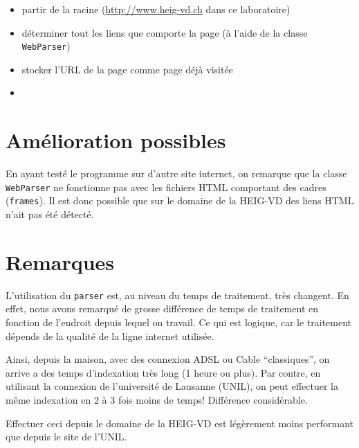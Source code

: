 \documentclass[a4paper, 11pt]{article}
\begin{document}
{\begin{itemize}
	\item partir de la racine (\url{http://www.heig-vd.ch} dans ce laboratoire)
	\item déterminer tout les liens que comporte la page (à l'aide de la classe \texttt{WebParser})
	\item stocker l'URL de la page comme page déjà visitée
	\item 
\end{itemize}

\section{Amélioration possibles} 

En ayant testé le programme sur d'autre site internet, on remarque que la classe \texttt{WebParser} ne fonctionne pas avec les fichiers HTML comportant des cadres (\texttt{frames}). Il est donc possible que sur le domaine de la HEIG-VD des liens HTML n'ait pas été détecté.



\section{Remarques} 

L'utilisation du \texttt{parser} est, au niveau du temps de traitement, très changent. En effet, nous avons remarqué de grosse différence de temps de traitement en fonction de l'endroit depuis lequel on travail. Ce qui est logique, car le traitement dépends de la qualité de la ligne internet utilisée.

Ainsi, depuis la maison, avec des connexion ADSL ou Cable “classiques”, on arrive a des temps d'indexation très long (1 heure ou plus). Par contre, en utilisant la connexion de l'université de Lausanne (UNIL), on peut effectuer la même indexation en 2 à 3 fois moins de temps! Différence considérable.

Effectuer ceci depuis le domaine de la HEIG-VD est légèrement moins performant que depuis le site de l'UNIL. 

}
\end{document}
